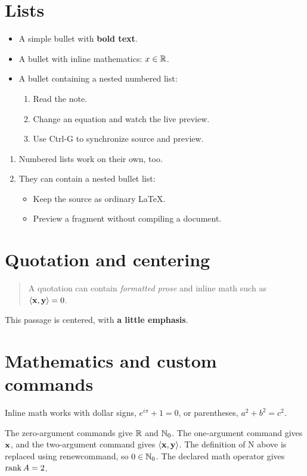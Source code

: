 \section{Lists}
\begin{itemize}
  \item A simple bullet with \textbf{bold text}.
  \item A bullet with inline mathematics: $x\in\mathbb{R}$.
  \item A bullet containing a nested numbered list:
  \begin{enumerate}
    \item Read the note.
    \item Change an equation and watch the live preview.
    \item Use Ctrl-G to synchronize source and preview.
  \end{enumerate}
\end{itemize}

\begin{enumerate}
  \item Numbered lists work on their own, too.
  \item They can contain a nested bullet list:
  \begin{itemize}
    \item Keep the source as ordinary LaTeX.
    \item Preview a fragment without compiling a document.
  \end{itemize}
\end{enumerate}

\section{Quotation and centering}
\begin{quote}
A quotation can contain \textit{formatted prose} and inline math such as
$\langle \mathbf{x},\mathbf{y}\rangle=0$.
\end{quote}

\begin{center}
This passage is centered, with \textbf{a little emphasis}.
\end{center}

\section{Mathematics and custom commands}
Inline math works with dollar signs, $e^{i\pi}+1=0$, or parentheses,
\(a^2+b^2=c^2\).

The zero-argument commands give $\mathbb{R}$ and $\mathbb{N}_0$.
The one-argument command gives $\mathbf{x}$, and the two-argument command gives
$\langle \mathbf{x},\mathbf{y}\rangle$.
The definition of N above is replaced using renewcommand, so $0\in\mathbb{N}_0$.
The declared math operator gives $\operatorname{rank} A=2$.

